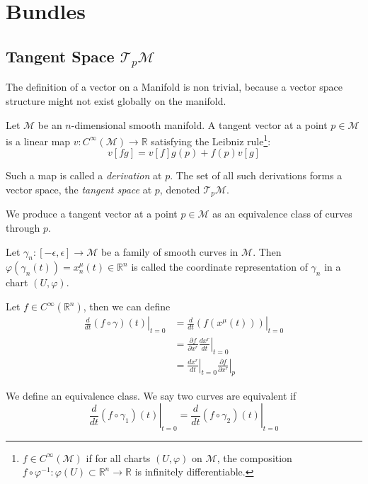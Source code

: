 
\section{Bundles}


\subsection{Tangent Space $\mathcal{T}_p\mathcal{M}$}

  The definition of a vector on a Manifold is non trivial, because a vector space structure might not exist globally on the manifold.

  Let $\mathcal{M}$ be an $n$-dimensional smooth manifold. A tangent vector at a point $p \in \mathcal{M}$ is a linear map $v: C^\infty(\mathcal{M}) \to \mathbb{R}$ satisfying the Leibniz rule\footnote{$f \in C^\infty(\mathcal{M})$ if for all charts $(U, \varphi)$ on $\mathcal{M}$, the composition $f \circ \varphi^{-1}: \varphi(U) \subset \mathbb{R}^n \to \mathbb{R}$ is infinitely differentiable.}:
  \[ v[fg] = v[f]g(p) + f(p)v[g] \]
  
  Such a map is called a \textit{derivation} at $p$. The set of all such derivations forms a vector space, the \textit{tangent space} at $p$, denoted $\mathcal{T}_p\mathcal{M}$.

  We produce a tangent vector at a point $p \in \mathcal{M}$ as an equivalence class of curves through $p$.

  Let $\gamma_n: [-\epsilon, \epsilon] \to \mathcal{M}$ be a family of smooth curves in $\mathcal{M}$. Then $\varphi(\gamma_n(t)) = x_n^\mu(t) \in \mathbb{R}^n$ is called the coordinate representation of $\gamma_n$ in a chart $(U, \varphi)$.

Let $f \in C^\infty(\mathbb{R}^n)$, then we can define
\begin{align*}
\left. \frac{d}{dt} (f \circ \gamma)(t) \right|_{t=0}
&= \left. \frac{d}{dt} \left( f(x^\mu(t)) \right) \right|_{t=0} \\
&= \left. \frac{\partial f}{\partial x^r} \frac{d x^r}{dt} \right|_{t=0} \\
&= \left. \frac{d x^r}{dt} \right|_{t=0} \left. \frac{\partial f}{\partial x^r} \right|_p
\end{align*}

We define an equivalence class.  
We say two curves are equivalent  
if
\[
\left. \frac{d}{dt} \left( f \circ \gamma_1 \right)(t) \right|_{t=0}
= \left. \frac{d}{dt} \left( f \circ \gamma_2 \right)(t) \right|_{t=0}
\]

